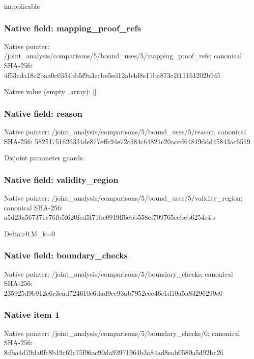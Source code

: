 \documentclass[10pt,a4paper]{article}
\begin{document}
\begingroup\raggedright\sloppy inapplicable\par\endgroup

\subsubsection{Native field: mapping\_\allowbreak{}proof\_\allowbreak{}refs}
Native pointer: /joint\_\allowbreak{}analysis/comparisons/5/bound\_\allowbreak{}uses/5/mapping\_\allowbreak{}proof\_\allowbreak{}refs; canonical SHA-256: 4f53cda18c2baa0c0354bb5f9a3ecbe5ed12ab4d8e11ba873c2f11161202b945

Native value (empty\_\allowbreak{}array): []

\subsubsection{Native field: reason}
Native pointer: /joint\_\allowbreak{}analysis/comparisons/5/bound\_\allowbreak{}uses/5/reason; canonical SHA-256: 58251751626334de877effc94e72c384c64821c20accd64819ddd45843ac6519

\begingroup\raggedright\sloppy Disjoint parameter guards.\par\endgroup

\subsubsection{Native field: validity\_\allowbreak{}region}
Native pointer: /joint\_\allowbreak{}analysis/comparisons/5/bound\_\allowbreak{}uses/5/validity\_\allowbreak{}region; canonical SHA-256: a5d23a567371c76fb5f620fed5f71be0919ff6ebb558cf709765eebeb6254c4b

\begingroup\raggedright\sloppy Delta>0,\allowbreak{}M\_\allowbreak{}k=\allowbreak{}0\par\endgroup

\subsubsection{Native field: boundary\_\allowbreak{}checks}
Native pointer: /joint\_\allowbreak{}analysis/comparisons/5/boundary\_\allowbreak{}checks; canonical SHA-256: 235925d9b912e6c3cad724610c6dad9ce93ab7952cec46e1d10a5a83296299c0

\subsubsection{Native item 1}
Native pointer: /joint\_\allowbreak{}analysis/comparisons/5/boundary\_\allowbreak{}checks/0; canonical SHA-256: 8dba4d79da0fc8b19c69c75f96ac90da93971964b3a84ad8eab0580a5d92bc26
\end{document}
